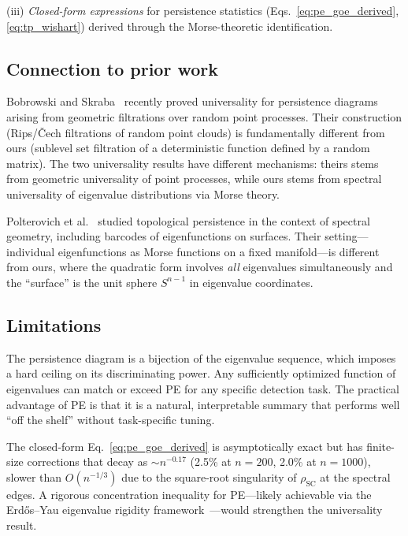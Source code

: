 \documentclass[aps,pre,twocolumn,superscriptaddress,showpacs]{revtex4-2}
\begin{document}
(iii) \textit{Closed-form expressions} for persistence statistics (Eqs.~\ref{eq:pe_goe_derived}, \ref{eq:tp_wishart}) derived through the Morse-theoretic identification.

\subsection{Connection to prior work}

Bobrowski and Skraba~\cite{bobrowski2024} recently proved universality for persistence diagrams arising from geometric filtrations over random point processes. Their construction (Rips/\v{C}ech filtrations of random point clouds) is fundamentally different from ours (sublevel set filtration of a deterministic function defined by a random matrix). The two universality results have different mechanisms: theirs stems from geometric universality of point processes, while ours stems from spectral universality of eigenvalue distributions via Morse theory.

Polterovich et al.~\cite{polterovich2019} studied topological persistence in the context of spectral geometry, including barcodes of eigenfunctions on surfaces. Their setting---individual eigenfunctions as Morse functions on a fixed manifold---is different from ours, where the quadratic form involves \textit{all} eigenvalues simultaneously and the ``surface'' is the unit sphere $S^{n-1}$ in eigenvalue coordinates.

\subsection{Limitations}

The persistence diagram is a bijection of the eigenvalue sequence, which imposes a hard ceiling on its discriminating power. Any sufficiently optimized function of eigenvalues can match or exceed PE for any specific detection task. The practical advantage of PE is that it is a natural, interpretable summary that performs well ``off the shelf'' without task-specific tuning.

The closed-form Eq.~\eqref{eq:pe_goe_derived} is asymptotically exact but has finite-size corrections that decay as $\sim n^{-0.17}$ (2.5\% at $n = 200$, 2.0\% at $n = 1000$), slower than $O(n^{-1/3})$ due to the square-root singularity of $\rho_{\mathrm{SC}}$ at the spectral edges. A rigorous concentration inequality for PE---likely achievable via the Erd\H{o}s--Yau eigenvalue rigidity framework~\cite{erdos2017}---would strengthen the universality result.
\end{document}
